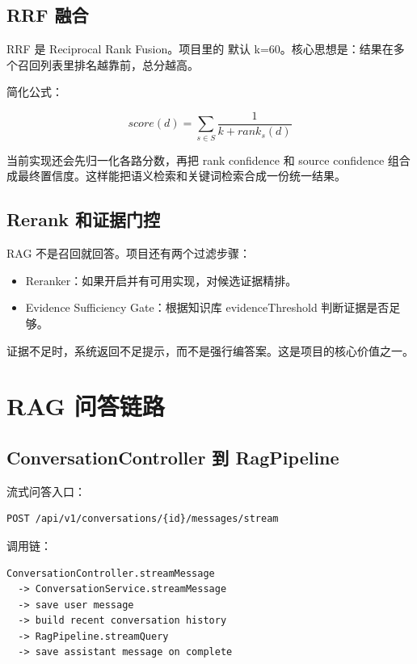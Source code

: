 \documentclass[UTF8,zihao=-4]{ctexart}
\begin{document}
\subsection{RRF 融合}

RRF 是 Reciprocal Rank Fusion。项目里的  默认 k=60。核心思想是：结果在多个召回列表里排名越靠前，总分越高。

简化公式：

\[
  score(d)=\sum_{s \in S}\frac{1}{k + rank_s(d)}
\]

当前实现还会先归一化各路分数，再把 rank confidence 和 source confidence 组合成最终置信度。这样能把语义检索和关键词检索合成一份统一结果。

\subsection{Rerank 和证据门控}

RAG 不是召回就回答。项目还有两个过滤步骤：

\begin{itemize}
  \item Reranker：如果开启并有可用实现，对候选证据精排。
  \item Evidence Sufficiency Gate：根据知识库 evidenceThreshold 判断证据是否足够。
\end{itemize}

证据不足时，系统返回不足提示，而不是强行编答案。这是项目的核心价值之一。

\section{RAG 问答链路}

\subsection{ConversationController 到 RagPipeline}

流式问答入口：

\begin{lstlisting}[style=code]
POST /api/v1/conversations/{id}/messages/stream
\end{lstlisting}

调用链：

\begin{lstlisting}[style=code]
ConversationController.streamMessage
  -> ConversationService.streamMessage
  -> save user message
  -> build recent conversation history
  -> RagPipeline.streamQuery
  -> save assistant message on complete
\end{lstlisting}
\end{document}
